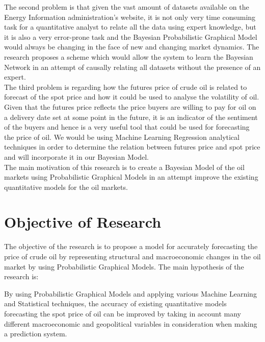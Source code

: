 The second problem is that given the vast amount of datasets available on the Energy Information administration's website, it is not only very time consuming task for a quantitative analyst to relate all the data using expert knowledge, but it is also a very error-prone task and the Bayesian Probabilistic Graphical Model would always be changing in the face of new and changing market dynamics. The research proposes a scheme which would allow the system to learn the Bayesian Network in an attempt of causally relating all datasets without the presence of an expert.\\

The third problem is regarding how the futures price of crude oil is related to forecast of the spot price and how it could be used to analyse the volatility of oil. Given that the futures price reflects the price buyers are willing to pay for oil on a delivery date set at some point in the future, it is an indicator of the sentiment of the buyers and hence is a very useful tool that could be used for forecasting the price of oil. We would be using Machine Learning Regression analytical techniques in order to determine the relation between futures price and spot price and will incorporate it in our Bayesian Model. \\

The main motivation of this research is to create a Bayesian Model of the oil markets using Probabilistic Graphical Models in an attempt improve the existing quantitative models for the oil markets.\\

\section{Objective of Research}

The objective of the research is to propose a model for accurately forecasting the price of crude oil by representing structural and macroeconomic changes in the oil market by using Probabilistic Graphical Models. The main hypothesis of the research is: \\

\begin{displayquote}
By using Probabilistic Graphical Models and applying various Machine Learning and Statistical techniques, the accuracy of existing quantitative models forecasting the spot price of oil can be improved by taking in account many different macroeconomic and geopolitical variables in consideration when making a prediction system.
\end{displayquote}



